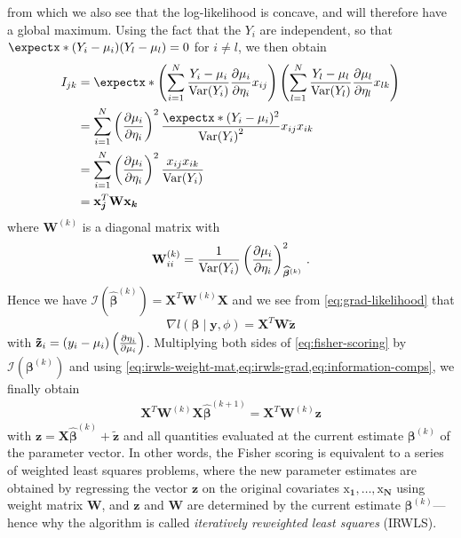 \documentclass[a4paper]{book}
\begin{document}
from which we also see that the log-likelihood is concave, and will therefore have a global maximum. Using the fact that the $Y_i$ are independent, so that $\expect{(Y_i - \mu_i)(Y_l - \mu_l)} = 0$ for $i \neq l$, we then obtain
\begin{align}
  I_{jk} &= \expect{\left( \sum_{i = 1}^N \frac{Y_i - \mu_i}{\var{Y_i}} \pdv{\mu_i}{\eta_i} x_{ij}\right) \left( \sum_{l = 1}^N \frac{Y_l - \mu_l}{\var{Y_l}} \frac{\partial \mu_l}{\partial \eta_l} x_{lk} \right)} \\
  &= \sum_{i = 1}^N \left( \pdv{\mu_i}{\eta_i} \right)^2 \frac{\expect{(Y_i - \mu_i)^2}}{\var{Y_i}^2} x_{ij} x_{ik} \\
  &= \sum_{i = 1}^N \left( \pdv{\mu_i}{\eta_i} \right)^2 \frac{x_{ij} x_{ik}}{\var{Y_i}} \\
  & = \bm{\mathrm{x}_j}^T \mathbf{W} \bm{\mathrm{x}_k} \label{eq:information-comps}
\end{align}
where $\mathbf{W}^{(k)}$ is a diagonal matrix with
\begin{equation} \label{eq:irwls-weight-mat}
  \mathbf{W}^{(k)}_{ii} = \frac{1}{\var{Y_i}} \pdv{\mu_i}{\eta_i}_{\bm{\widehat{\beta}}^{(k)}}^2 \,.
\end{equation}
Hence we have $\mathcal{I}(\bm{\widehat{\beta}}^{(k)}) = \mathbf{X}^T \mathbf{W}^{(k)} \mathbf{X}$ and we see from \cref{eq:grad-likelihood} that
\begin{equation} \label{eq:irwls-grad}
  \nabla l(\bm{\beta} \mid \mathbf{y}, \phi) = \mathbf{X}^T \mathbf{W} \mathbf{\tilde{z}}
\end{equation}
with $\mathbf{\tilde{z}}_i = (y_i - \mu_i) \left( \pdv{\eta_i}{\mu_i} \right)$. Multiplying both sides of \ref{eq:fisher-scoring} by $\mathcal{I}(\bm{\beta}^{(k)})$ and using \cref{eq:irwls-weight-mat,eq:irwls-grad,eq:information-comps}, we finally obtain
\begin{align} \label{eq:irwls-iter}
  \mathbf{X}^T \mathbf{W}^{(k)} \mathbf{X} \bm{\widehat{\beta}}^{(k + 1)} =  \mathbf{X}^T \mathbf{W}^{(k)} \mathbf{z}
\end{align}
with $\mathbf{z} = \mathbf{X} \bm{\widehat{\beta}}^{(k)} + \mathbf{\tilde{z}}$ and all quantities evaluated at the current estimate $\bm{\beta}^{(k)}$ of the parameter vector. In other words, the Fisher scoring is equivalent to a series of weighted least squares problems, where the new parameter estimates are obtained by regressing the vector $\mathbf{z}$ on the original covariates $\bm{\mathrm{x}_1}, \dots, \bm{\mathrm{x}_N}$ using weight matrix $\mathbf{W}$, and $\mathbf{z}$ and $\mathbf{W}$ are determined by the current estimate $\bm{\beta}^{(k)}$---hence why the algorithm is called \emph{iteratively reweighted least squares} (IRWLS).
\end{document}
